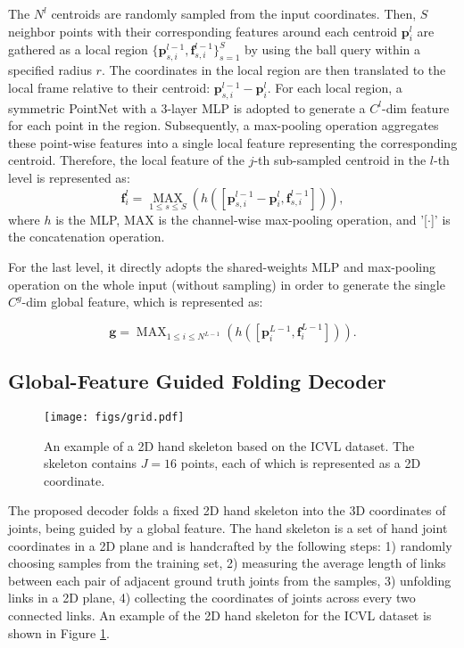 \documentclass[10pt,twocolumn,letterpaper]{article}
\begin{document}
The $N^l$ centroids are randomly sampled from the input coordinates. Then, $S$ neighbor points with their corresponding features around each centroid $\textbf{p}_i^l$ are gathered as a local region $\{ \textbf{p}_{s,i}^{l-1},\textbf{f}_{s,i}^{l-1} \}_{s = 1}^S$ by using the ball query \cite{qi2017pointnet++} within a specified radius $r$. The coordinates in the local region are then translated to the local frame relative to their centroid: $\textbf{p}_{s,i}^{l-1} -\textbf{p}_i^l$.
For each local region, a symmetric PointNet \cite{qi2017pointnet} with a 3-layer MLP is adopted to generate a $C^l$-dim feature for each point in the region. Subsequently, a max-pooling operation aggregates these point-wise features into a single local feature representing the corresponding centroid. Therefore, the local feature of the $j$-th sub-sampled centroid in the $l$-th level is represented as:
\begin{equation}
\textbf{f}_i^l = \mathop{MAX}\limits_{1 \leq s \leq S} (h([\textbf{p}_{s,i}^{l-1} -\textbf{p}_i^l, \textbf{f}_{s,i}^{l-1}])),
\end{equation}
where $h$ is the MLP, MAX is the channel-wise max-pooling operation, and '[$\cdot$]' is the concatenation operation.

For the last level, it directly adopts the shared-weights MLP and max-pooling operation on the whole input (without sampling) in order to generate the single $C^g$-dim global feature, which is represented as:

\begin{equation}
\textbf{g} = \mathop{MAX}_{1 \leq i \leq N^{L-1}} (h([\textbf{p}_i^{L-1}, \textbf{f}_i^{L-1}])).
\end{equation}



\subsection{Global-Feature Guided Folding Decoder}

\begin{figure}
\centering
\texttt{[image: figs/grid.pdf]}
\caption{An example of a 2D hand skeleton based on the ICVL dataset. The skeleton contains $J=16$ points, each of which is represented as a 2D coordinate.}
\label{fig:grid}
\end{figure}

The proposed decoder folds a fixed 2D hand skeleton into the 3D coordinates of joints, being guided by a global feature. The hand skeleton is a set of hand joint coordinates in a 2D plane and is handcrafted by the following steps: 1) randomly choosing samples from the training set, 2) measuring the average length of links between each pair of adjacent ground truth joints from the samples, 3) unfolding links in a 2D plane, 4) collecting the coordinates of joints across every two connected links. An example of the 2D hand skeleton for the ICVL dataset is shown in Figure \ref{fig:grid}. 
\end{document}
